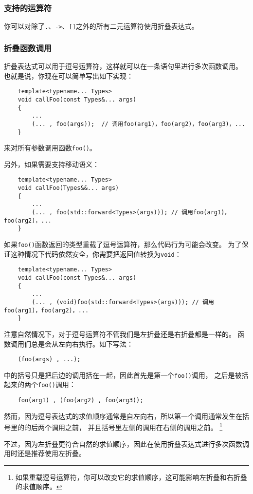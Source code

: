 \subsubsection{支持的运算符}
你可以对除了\texttt{.}、\texttt{->}、\texttt{[]}之外的所有二元运算符使用折叠表达式。

\subsubsection*{折叠函数调用}
折叠表达式可以用于逗号运算符，这样就可以在一条语句里进行多次函数调用。
也就是说，你现在可以简单写出如下实现：
\begin{lstlisting}
    template<typename... Types>
    void callFoo(const Types&... args)
    {
        ...
        (... , foo(args));  // 调用foo(arg1)，foo(arg2)，foo(arg3)，...
    }
\end{lstlisting}
来对所有参数调用函数\texttt{foo()}。

另外，如果需要支持移动语义：
\begin{lstlisting}
    template<typename... Types>
    void callFoo(Types&&... args)
    {
        ...
        (... , foo(std::forward<Types>(args))); // 调用foo(arg1)，foo(arg2)，...
    }
\end{lstlisting}

如果\texttt{foo()}函数返回的类型重载了逗号运算符，那么代码行为可能会改变。
为了保证这种情况下代码依然安全，你需要把返回值转换为\texttt{void}：
\begin{lstlisting}
    template<typename... Types>
    void callFoo(const Types&... args)
    {
        ...
        (... , (void)foo(std::forward<Types>(args))); // 调用foo(arg1)，foo(arg2)，...
    }
\end{lstlisting}
注意自然情况下，对于逗号运算符不管我们是左折叠还是右折叠都是一样的。
函数调用们总是会从左向右执行。如下写法：
\begin{lstlisting}
    (foo(args) , ...);
\end{lstlisting}
中的括号只是把后边的调用括在一起，因此首先是第一个\texttt{foo()}调用，
之后是被括起来的两个\texttt{foo()}调用：
\begin{lstlisting}
    foo(arg1) , (foo(arg2) , foo(arg3));
\end{lstlisting}
然而，因为逗号表达式的求值顺序通常是自左向右，所以第一个调用通常发生在括号里的的后两个调用之前，
并且括号里左侧的调用在右侧的调用之前。
\footnote{如果重载逗号运算符，你可以改变它的求值顺序，这可能影响左折叠和右折叠的求值顺序。}

不过，因为左折叠更符合自然的求值顺序，因此在使用折叠表达式进行多次函数调用时还是推荐使用左折叠。

